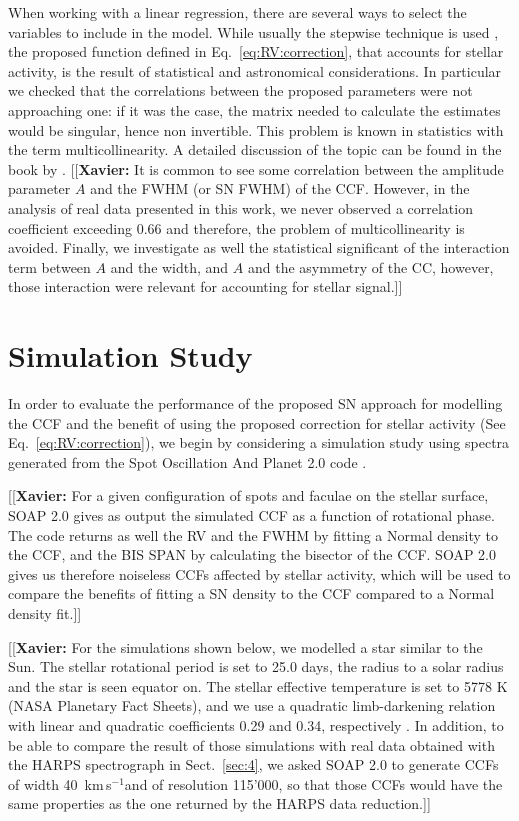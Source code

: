 \documentclass{aa}
\def\kms{\hbox{\,km\,s$^{-1}$}}       %
\newcommand{\xavier}[1]{{\color{blue}[[\textbf{Xavier: }#1]]}}
\begin{document}
When working with a linear regression, there are several ways to select the variables to include in the model. While usually the stepwise technique is used \citep{efroymson1960multiple,hocking1976biometrics}, the proposed function defined in Eq.~\ref{eq:RV:correction}, that accounts for stellar activity, is the result of statistical and astronomical considerations. In particular we checked that the correlations between the proposed parameters were not approaching one: if it was the case, the matrix needed to calculate the estimates would be singular, hence non invertible. This problem is known in statistics with the term multicollinearity. A detailed discussion of the topic can be found in the book by \citet{belsley1991}. \xavier{It is common to see some correlation between the amplitude parameter $A$ and the FWHM (or SN FWHM) of the CCF. However, in the analysis of real data presented in this work, we never observed a correlation coefficient exceeding $0.66$ and therefore, the problem of multicollinearity is avoided. Finally, we investigate as well the statistical significant of the interaction term between $A$ and the width, and $A$ and the asymmetry of the CC, however, those interaction were relevant for accounting for stellar signal.}

\section{Simulation Study} \label{sec:soap}
In order to evaluate the performance of the proposed SN approach for modelling the CCF and the benefit of using the proposed correction for stellar activity (See Eq.~\ref{eq:RV:correction}), we begin by considering a simulation study using spectra generated from the Spot Oscillation And Planet 2.0 code \citep[SOAP 2.0,][]{Dumusque-2014b}.

\xavier{For a given configuration of spots and faculae on the stellar surface, SOAP 2.0 gives as output the simulated CCF as a function of rotational phase. The code returns as well the RV and the FWHM by fitting a Normal density to the CCF, and the BIS SPAN by calculating the bisector of the CCF. SOAP 2.0 gives us therefore noiseless CCFs affected by stellar activity, which will be used to compare the benefits of fitting a SN density to the CCF compared to a Normal density fit.}

\xavier{For the simulations shown below, we modelled a star similar to the Sun. The stellar rotational period is set to 25.0 days, the radius to a solar radius and the star is seen equator on. The stellar effective temperature is set to 5778 K (NASA Planetary Fact Sheets), and we use a quadratic limb-darkening relation with linear and quadratic coefficients 0.29 and 0.34, respectively \citep[][]{Oshagh-2013a, Claret-2011}. In addition, to be able to compare the result of those simulations with real data obtained with the HARPS spectrograph in Sect.~\ref{sec:4}, we asked SOAP 2.0 to generate CCFs of width 40 \kms and of resolution 115'000, so that those CCFs would have the same properties as the one returned by the HARPS data reduction.}
\end{document}

